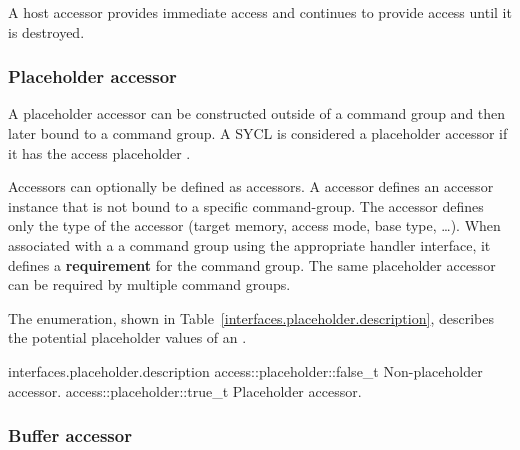 A host accessor provides immediate access and continues to provide access until
it is destroyed.


\subsubsection{Placeholder accessor}
\label{sub.section.access.placeholder}

A placeholder accessor can be constructed outside of a command group and then
later bound to a command group. A SYCL  is considered a
placeholder accessor if it has the access placeholder .

Accessors can optionally be defined as  accessors.
A  accessor defines an accessor instance that is
not bound to a specific \gls{command-group}. The accessor defines only
the type of the accessor (target memory, access mode, base type, \ldots).
When associated with a a command group using the appropriate
handler interface, it defines a \textbf{requirement} for the command group.
The same placeholder accessor can be required by multiple command groups.

The  enumeration, shown in
Table~\ref{interfaces.placeholder.description}, describes the potential
placeholder values of an .

 {interfaces.placeholder.description}
 \addRow
    {access::placeholder::false_t}
    {
      Non-placeholder accessor.
    }
  \addRow
    {access::placeholder::true_t}
    {
      Placeholder accessor.
    }
\completeTable


\subsubsection{Buffer accessor}
\label{sub.section.accessors.buffer}

